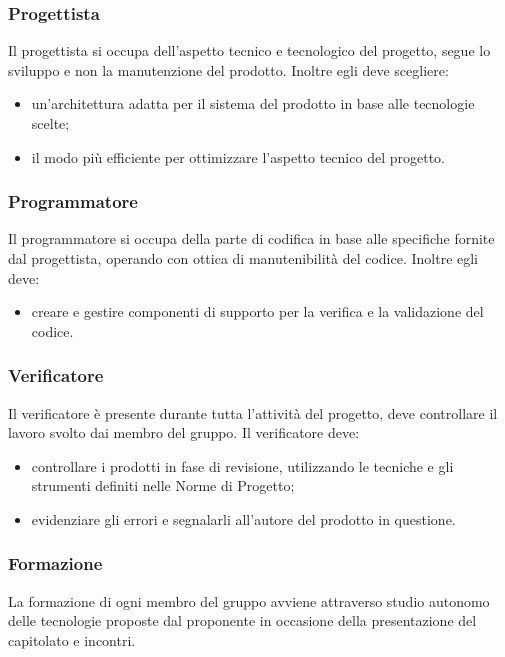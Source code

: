 \subsubsection{Progettista}
Il progettista si occupa dell'aspetto tecnico e tecnologico del progetto, segue lo sviluppo e non la manutenzione del prodotto. Inoltre egli deve scegliere: 
\begin{itemize}
\item un'architettura adatta per il sistema del prodotto in base alle tecnologie scelte;
\item il modo più efficiente per ottimizzare l'aspetto tecnico del progetto.
\end{itemize}
\subsubsection{Programmatore}
Il programmatore si occupa della parte di codifica in base alle specifiche fornite dal progettista, operando con ottica di manutenibilità del codice. Inoltre egli deve: 
\begin{itemize}
\item creare e gestire componenti di supporto per la verifica e la validazione del codice. 
\end{itemize}

\subsubsection{Verificatore}
Il verificatore è presente durante tutta l'attività   del progetto, deve controllare il lavoro svolto dai membro del gruppo. Il  verificatore deve: 
\begin{itemize}
\item controllare i prodotti in fase di revisione, utilizzando le tecniche e gli strumenti definiti nelle Norme di Progetto; 
\item evidenziare gli errori e segnalarli all'autore del prodotto in questione.
\end{itemize}

\subsubsection{Formazione}
La formazione di ogni membro del gruppo avviene attraverso studio autonomo delle tecnologie proposte dal proponente in occasione della presentazione del capitolato e incontri. 

